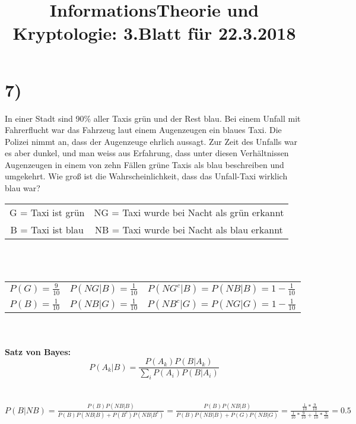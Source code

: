 \documentclass[11pt,a4paper]{article}
\author{}
\begin{document}
	\title{InformationsTheorie und Kryptologie: 3.Blatt für 22.3.2018}
	\maketitle

	\section*{7)}

	In einer Stadt sind 90\% aller Taxis grün und der Rest blau. Bei einem Unfall mit Fahrerflucht war das Fahrzeug laut einem Augenzeugen ein blaues Taxi. Die Polizei nimmt an, dass der Augenzeuge ehrlich aussagt. Zur Zeit des Unfalls war es aber dunkel, und man weiss aus Erfahrung, dass unter diesen Verhältnissen Augenzeugen in einem von zehn Fällen grüne Taxis als blau beschreiben und umgekehrt. Wie groß ist die Wahrscheinlichkeit, dass das Unfall-Taxi wirklich blau war?\\
	\newline
	\def\arraystretch{1.5}%
	\begin{tabular}{cc}
		G = Taxi ist grün & NG = Taxi wurde bei Nacht als grün erkannt \\
		B = Taxi ist blau & NB = Taxi wurde bei Nacht als blau erkannt \\
	\end{tabular} \\
	\\
	\def\arraystretch{1.5}%
	\begin{tabular}{c|c|c}
		\(P(G) = \frac{9}{10}\) & \(P(NG|B) = \frac{1}{10}\) & \(P(NG^c|B) = P(NB|B) = 1 - \frac{1}{10}\) \\
		\(P(B) = \frac{1}{10}\) & \(P(NB|G) = \frac{1}{10}\) & \(P(NB^c|G) = P(NG|G) = 1 - \frac{1}{10}\) \\
	\end{tabular} \\
	\\
	\textbf{Satz von Bayes:}\\
	\[P(A_k|B) = \frac{P(A_k)P(B|A_k)}{\sum_{i}^{}P(A_i)P(B|A_i)} \]\\
	\\
	\(P(B|NB) = \frac{P(B)P(NB|B)}{P(B)P(NB|B) + P(B^c)P(NB|B^c)} = \frac{P(B)P(NB|B)}{P(B)P(NB|B) + P(G)P(NB|G)} = \frac{\frac{1}{10}*\frac{9}{10}}{\frac{1}{10}*\frac{9}{10} + \frac{1}{10}*\frac{9}{10}} = 0.5 \) \\

	\newpage
\end{document}

